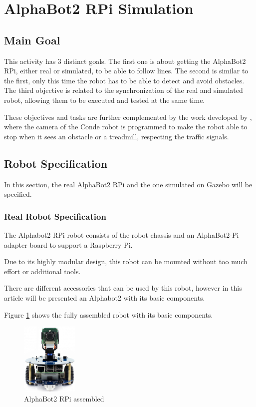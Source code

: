 \documentclass[conference]{IEEEtran}
\begin{document}
\section{AlphaBot2 RPi Simulation} \label{alpha}

\subsection{Main Goal} \label{goal}

This activity has 3 distinct goals. The first one is about getting the AlphaBot2 RPi, either real or simulated, to be able to follow lines. The second is similar to the first, only this time the robot has to be able to detect and avoid obstacles. The third objective is related to the synchronization of the real and simulated robot, allowing them to be executed and tested at the same time.

These objectives and tasks are further complemented by the work developed by \cite{b1, b2, b3}, where the camera of the Conde robot is programmed to make the robot able to stop when it sees an obstacle or a treadmill, respecting the traffic signals.

\subsection{Robot Specification} \label{spec}

In this section, the real AlphaBot2 RPi and the one simulated on Gazebo will be specified.

\subsubsection{Real Robot Specification} \label{spec_real}

The Alphabot2 RPi robot consists of the robot chassis and an AlphaBot2-Pi adapter board to support a Raspberry Pi.

Due to its highly modular design, this robot can be mounted without too much effort or additional tools.

There are different accessories that can be used by this robot, however in this article will be presented an Alphabot2 with its basic components.

Figure \ref{fig:fig1} shows the fully assembled robot with its basic components.

\begin{figure}[H]
    \centering
    \includegraphics[width=2.7cm]{Alphabot2.png}
    \caption{AlphaBot2 RPi assembled}
    \label{fig:fig1}
\end{figure}
\end{document}
